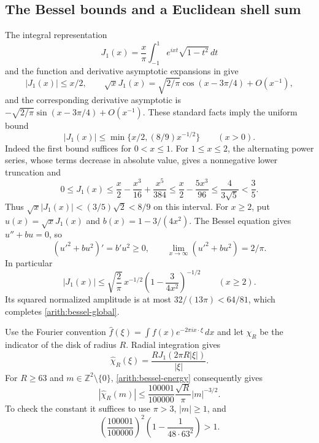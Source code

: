\documentclass[11pt,reqno]{amsart}
\numberwithin{equation}{section}
\begin{document}
\subsection{The Bessel bounds and a Euclidean shell sum}

The integral representation
\[
 J_1(x)=\frac{x}{\pi}\int_{-1}^{1}
                    e^{ixt}\sqrt{1-t^2}\,dt
\]
and the function and derivative asymptotic expansions in
\cite[\S\S10.9,10.17]{DLMF} give
\[
 |J_1(x)|\le x/2,\qquad
 \sqrt{x}J_1(x)=\sqrt{2/\pi}\cos(x-3\pi/4)+O(x^{-1}),
\]
and the corresponding derivative asymptotic is
$-\sqrt{2/\pi}\sin(x-3\pi/4)+O(x^{-1})$.
These standard facts imply the uniform bound
\begin{equation}\label{arith:bessel-global}
 |J_1(x)|\le\min\{x/2,(8/9)x^{-1/2}\}\qquad(x>0).
\end{equation}
Indeed the first bound suffices for $0<x\le1$.  For $1\le x\le2$,
the alternating power series, whose terms decrease in absolute value,
gives a nonnegative lower truncation and
\[
 0\le J_1(x)\le \frac{x}{2}-\frac{x^3}{16}+\frac{x^5}{384}
 \le\frac{x}{2}-\frac{5x^3}{96}
 \le\frac4{3\sqrt5}<\frac35.
\]
Thus $\sqrt{x}|J_1(x)|<(3/5)\sqrt2<8/9$ on this interval.
For $x\ge2$, put $u(x)=\sqrt{x}J_1(x)$ and
$b(x)=1-3/(4x^2)$.  The Bessel equation gives $u''+bu=0$, so
\[
 (u'^2+bu^2)'=b'u^2\ge0,
 \qquad \lim_{x\to\infty}(u'^2+bu^2)=2/\pi.
\]
In particular
\begin{equation}\label{arith:bessel-energy}
 |J_1(x)|\le
 \sqrt{\frac2\pi}\,x^{-1/2}
       \left(1-\frac3{4x^2}\right)^{-1/2}\qquad(x\ge2).
\end{equation}
Its squared normalized amplitude is at most $32/(13\pi)<64/81$,
which completes \eqref{arith:bessel-global}.

Use the Fourier convention $\widehat f(\xi)=
\int f(x)e^{-2\pi i x\cdot\xi}\,dx$ and let $\chi_R$ be the
indicator of the disk of radius $R$.  Radial integration gives
\[
 \widehat\chi_R(\xi)=\frac{R J_1(2\pi R|\xi|)}{|\xi|}.
\]
For $R\ge63$ and $m\in\mathbb Z^2\setminus\{0\}$,
\eqref{arith:bessel-energy} consequently gives
\begin{equation}\label{arith:disk-fourier}
 |\widehat\chi_R(m)|\le
 \frac{100001}{100000}\frac{\sqrt R}{\pi}|m|^{-3/2}.
\end{equation}
To check the constant it suffices to use $\pi>3$, $|m|\ge1$, and
\[
 \left(\frac{100001}{100000}\right)^2
       \left(1-\frac1{48\cdot63^2}\right)>1.
\]
\end{document}
